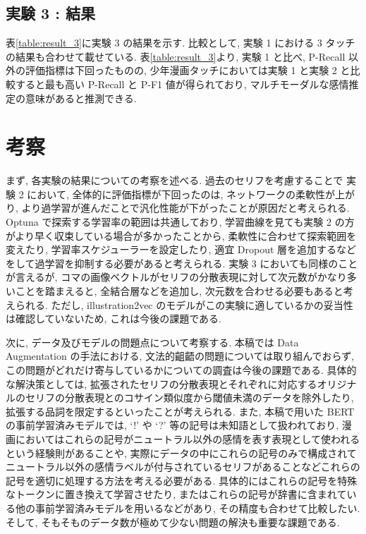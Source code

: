 \documentclass[twocolumn]{jarticle}     %
\begin{document}
\subsection{実験 3 : 結果}
表\ref{table:result_3}に実験 3 の結果を示す. 比較として, 実験 1 における 3 タッチの結果も合わせて載せている.
表\ref{table:result_3}より, 実験 1 と比べ, P-Recall 以外の評価指標は下回ったものの, 少年漫画タッチにおいては実験 1 と実験 2 と比較すると最も高い P-Recall と P-F1 値が得られており, マルチモーダルな感情推定の意味があると推測できる.


\section{考察}
まず, 各実験の結果についての考察を述べる. 過去のセリフを考慮することで 実験 2 において, 全体的に評価指標が下回ったのは, ネットワークの柔軟性が上がり, より過学習が進んだことで汎化性能が下がったことが原因だと考えられる. Optuna で探索する学習率の範囲は共通しており, 学習曲線を見ても実験 2 の方がより早く収束している場合が多かったことから, 柔軟性に合わせて探索範囲を変えたり, 学習率スケジューラーを設定したり, 適宜 Dropout 層を追加するなどをして過学習を抑制する必要があると考えられる. 実験 3 においても同様のことが言えるが, コマの画像ベクトルがセリフの分散表現に対して次元数がかなり多いことを踏まえると, 全結合層などを追加し, 次元数を合わせる必要もあると考えられる. ただし, illustration2vec のモデルがこの実験に適しているかの妥当性は確認していないため, これは今後の課題である.

次に, データ及びモデルの問題点について考察する. 本稿では Data Augmentation の手法における, 文法的齟齬の問題については取り組んでおらず, この問題がどれだけ寄与しているかについての調査は今後の課題である. 具体的な解決策としては, 拡張されたセリフの分散表現とそれぞれに対応するオリジナルのセリフの分散表現とのコサイン類似度から閾値未満のデータを除外したり, 拡張する品詞を限定するといったことが考えられる. また, 本稿で用いた BERT の事前学習済みモデルでは, `!' や `?' 等の記号は未知語として扱われており, 漫画においてはこれらの記号がニュートラル以外の感情を表す表現として使われるという経験則があることや, 実際にデータの中にこれらの記号のみで構成されてニュートラル以外の感情ラベルが付与されているセリフがあることなどこれらの記号を適切に処理する方法を考える必要がある. 具体的にはこれらの記号を特殊なトークンに置き換えて学習させたり, またはこれらの記号が辞書に含まれている他の事前学習済みモデルを用いるなどがあり, その精度も合わせて比較したい. そして, そもそものデータ数が極めて少ない問題の解決も重要な課題である.
\end{document}

